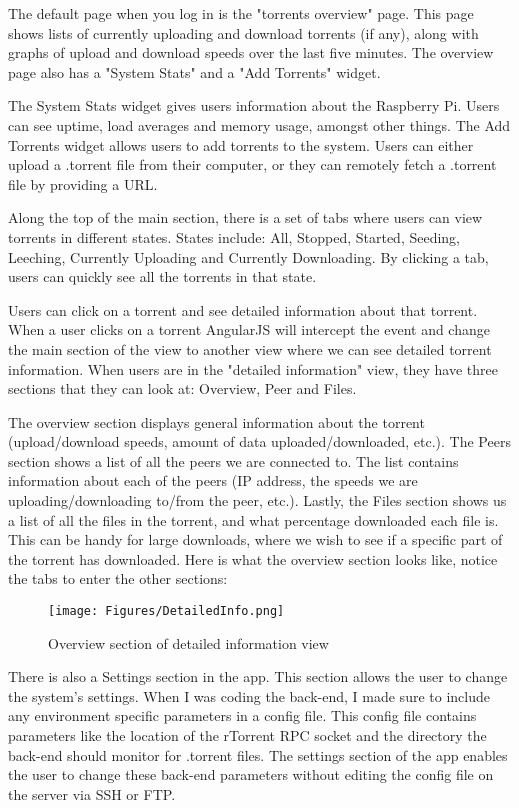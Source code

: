 The default page when you log in is the "torrents overview" page. This page shows lists of currently uploading and download torrents (if any), along with graphs of upload and download speeds over the last five minutes. The overview page also has a "System Stats" and a "Add Torrents" widget.

The System Stats widget gives users information about the Raspberry Pi. Users can see uptime, load averages and memory usage, amongst other things. The Add Torrents widget allows users to add torrents to the system. Users can either upload a .torrent file from their computer, or they can remotely fetch a .torrent file by providing a URL. 

Along the top of the main section, there is a set of tabs where users can view torrents in different states. States include: All, Stopped, Started, Seeding, Leeching, Currently Uploading and Currently Downloading. By clicking a tab, users can quickly see all the torrents in that state.

Users can click on a torrent and see detailed information about that torrent. When a user clicks on a torrent AngularJS will intercept the event and change the main section of the view to another view where we can see detailed torrent information. When users are in the "detailed information" view, they have three sections that they can look at: Overview, Peer and Files. 

The overview section displays general information about the torrent (upload/download speeds, amount of data uploaded/downloaded, etc.). The Peers section shows a list of all the peers we are connected to. The list contains information about each of the peers (IP address, the speeds we are uploading/downloading to/from the peer, etc.). Lastly, the Files section shows us a list of all the files in the torrent, and what percentage downloaded each file is. This can be handy for large downloads, where we wish to see if a specific part of the torrent has downloaded. Here is what the overview section looks like, notice the tabs to enter the other sections:

\vspace{10px}
\begin{figure}[h!]
  \centering
    \texttt{[image: Figures/DetailedInfo.png]}
  \caption{Overview section of detailed information view}
\end{figure}

There is also a Settings section in the app. This section allows the user to change the system's settings. When I was coding the back-end, I made sure to include any environment specific parameters in a config file. This config file contains parameters like the location of the rTorrent RPC socket and the directory the back-end should monitor for .torrent files. The settings section of the app enables the user to change these back-end parameters without editing the config file on the server via SSH or FTP.

